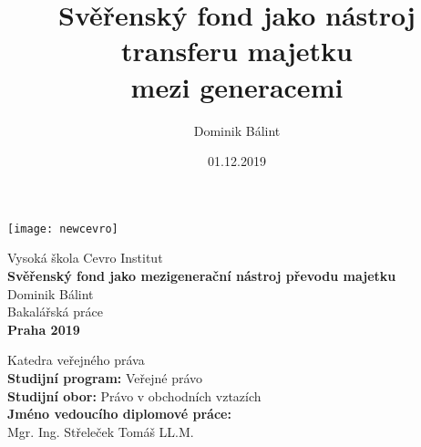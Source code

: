 \documentclass{article}
\begin{document}

\title{Svěřenský fond jako nástroj transferu majetku\\ mezi generacemi}
\author{Dominik Bálint}
\date{01.12.2019}


  \thispagestyle{empty}
  \begin{center}
  \texttt{[image: newcevro]} \\
  \end{center}
  \vspace{15mm}
  \begin{center}
  {\Large Vysoká škola Cevro Institut} \\
  \vspace{15mm}
  {\Large \textbf{Svěřenský fond jako mezigenerační nástroj převodu majetku}} \\
  \vspace{15mm}
  {\Large Dominik Bálint} \\
  \vspace{15mm}
  {\Large Bakalářská práce} \\
  \vspace{49mm}
  {\Large \textbf{Praha 2019}} \\
  \end{center}


\newpage
  \thispagestyle{empty}
  \maketitle
  \begin{center}
  {\Large Katedra veřejného práva} \\	
  \vspace{15mm}
  {\Large \textbf{Studijní program:} Veřejné právo} \\
  {\Large \textbf{Studijní obor:} Právo v obchodních vztazích} \\
  {\Large \textbf{Jméno vedoucího diplomové práce:} } \\
  {\Large Mgr. Ing.  Střeleček  Tomáš LL.M.} \\
  \end{center}
\end{document}
